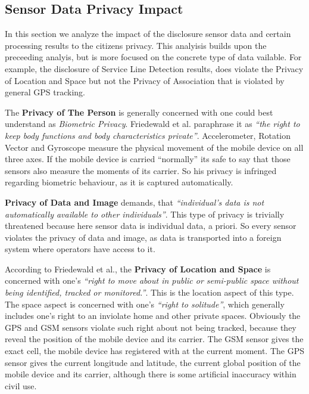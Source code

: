 \subsection{Sensor Data Privacy Impact}\label{sec:SensorPrivacyImpact}


In this section we analyze the impact of the disclosure sensor data and certain processing results to the citizens privacy.
This analyisis builds upon the preceeding analyis, but is more focused on the concrete type of data vailable.
For example, the disclosure of Service Line Detection results, does violate the Privacy of Location and Space but not the Privacy of Association that is violated by general GPS tracking.


The \textbf{Privacy of The Person} is generally concerned with one could best understand as \emph{Biometric Privacy}.
Friedewald et al. paraphrase it as \emph{``\om the right to keep body functions and body characteristics \om private''}.
Accelerometer, Rotation Vector and Gyroscope measure the physical movement of the mobile device on all three axes.
If the mobile device is carried ``normally'' its safe to say that those sensors also measure the moments of its carrier.
So his privacy is infringed regarding biometric behaviour, as it is captured automatically.

\textbf{Privacy of Data and Image} demands, that \emph{``individual's data is not automatically available to other individuals''}.
This type of privacy is trivially threatened because here sensor data is individual data, a priori.
So every sensor violates the privacy of data and image, as data is transported into a foreign system where operators have access to it.

According to Friedewald et al., the \textbf{Privacy of Location and Space} is concerned with one's \emph{``right to move about in public or semi-public space without being identified, tracked or monitored.''}.
This is the location aspect of this type. The space aspect is concerned with one's \emph{``right to solitude''}, which generally includes one's right to an inviolate home and other private spaces.
Obviously the GPS and GSM sensors violate such right about not being tracked, because they reveal the position of the mobile device and its carrier.
The GSM sensor gives the exact cell, the mobile device has registered with at the current moment.
The GPS sensor gives the current longitude and latitude, the current global position of the mobile device and its carrier, although there is some artificial inaccuracy within civil use.

